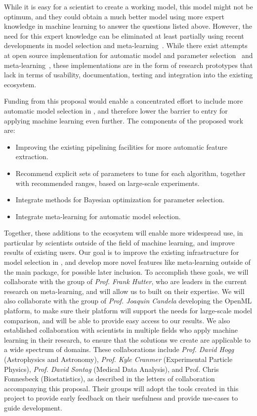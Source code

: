 While it is easy for a scientist to create a working model, this model might not
be optimum, and they could obtain a much better model using more expert knowledge
in machine learning to answer the questions listed above.
However, the need for this expert knowledge can be eliminated at least partially
using recent developments in model selection and
meta-learning~\autocite{NIPS2011_4443, feurer-nips2015,
snoek2015scalable, NIPS2012_4522}. While there exist attempts at
open source implementation for automatic model and parameter
selection~\autocite{bergstra2013hyperopt, komer2014hyperopt,
NIPS2012_4522, hutter2011sequential} and
meta-learning~\autocite{feurer-nips2015}, these implementations are
in the form of research prototypes that lack in terms of usability,
documentation, testing and integration into the existing
ecosystem.

Funding from this proposal would enable a concentrated effort to include more
automatic model selection in \sklearn{}, and therefore lower the barrier to
entry for applying machine learning even further.
The components of the proposed work are:
\begin{itemize}
    \item Improving the existing pipelining facilities for more automatic feature extraction.
    \item Recommend explicit sets of parameters to tune for each algorithm,
        together with recommended ranges, based on large-scale experiments.
    \item Integrate methods for Bayesian optimization for parameter selection.
    \item Integrate meta-learning for automatic model selection.
\end{itemize}
Together, these additions to the \sklearn{} ecosystem will enable more widespread use,
in particular by scientists outside of the field of machine learning, and improve results
of existing users.
Our goal is to improve the existing infrastructure for model selection in
\sklearn{}, and develop more novel features like meta-learning outside of the main
\sklearn{} package, for possible later inclusion.
To accomplish these goals, we will collaborate with the group of \emph{Prof.
Frank Hutter}, who are leaders in the current research on meta-learning, and
will allow us to built on their expertise.  We will also collaborate with the
group of \emph{Prof. Joaquin Candela} developing the OpenML platform, to make
sure their platform will support the needs for large-scale model comparison,
and will be able to provide easy access to our results.
We also established collaboration with scientists in multiple fields who apply
machine learning in their research, to ensure that the solutions we create are
applicable to a wide spectrum of domains.  These collaborations include
\emph{Prof. David Hogg} (Astrophysics and Astronomy), \emph{Prof. Kyle Cranmer}
(Experimental Particle Physics), \emph{Prof. David Sontag} (Medical Data
Analysis), and Prof. Chris Fonnesbeck (Biostatistics), as described in the
letters of collaboration accompanying this proposal. Their groups will adopt
the tools created in this project to provide early feedback on their usefulness
and provide use-cases to guide development.


